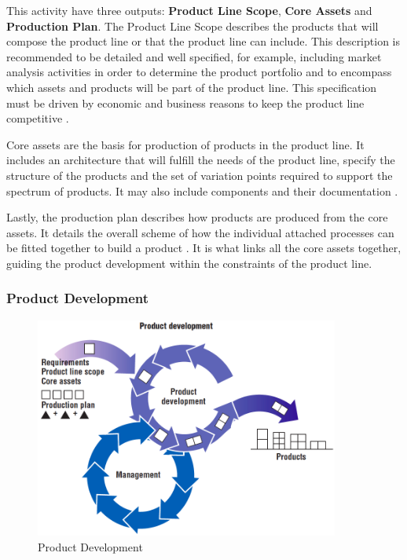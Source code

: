 This activity have three outputs: \textbf{Product Line Scope}, \textbf{Core
Assets} and \textbf{Production Plan}. The Product Line Scope describes the
products that will compose the product line or that the product line can include. This description is recommended to be detailed and well 
specified, for example, including market analysis activities in order to determine the product 
portfolio and to encompass which assets and products will be part of the product line. This 
specification must be driven by economic and business reasons to keep the product line 
competitive \citep{rafael2013systems}. 

Core assets are the basis for production of products in the product line. It
includes an architecture that will fulfill the needs of the product line, specify 
the structure of the products and the set of variation points required to support the 
spectrum of products. It may also include components and their documentation \citep{clements2002software}. 

Lastly, the production plan describes how products are produced from the core
assets. It details the overall scheme of how the individual attached processes can be 
fitted together to build a product \citep{clements2002software}. It is what links all the 
core assets together, guiding the product development within the constraints of the product line.

\subsubsection{Product Development}

\begin{figure}[htp]
\begin{center}
  \includegraphics[width=10cm]{chapters/background/img/SPLproduct-development.png}
  \caption[Product Development]{Product Development \citep{clements2002software}}
  \label{fg:spl-productdev}
\end{center}
\end{figure}

